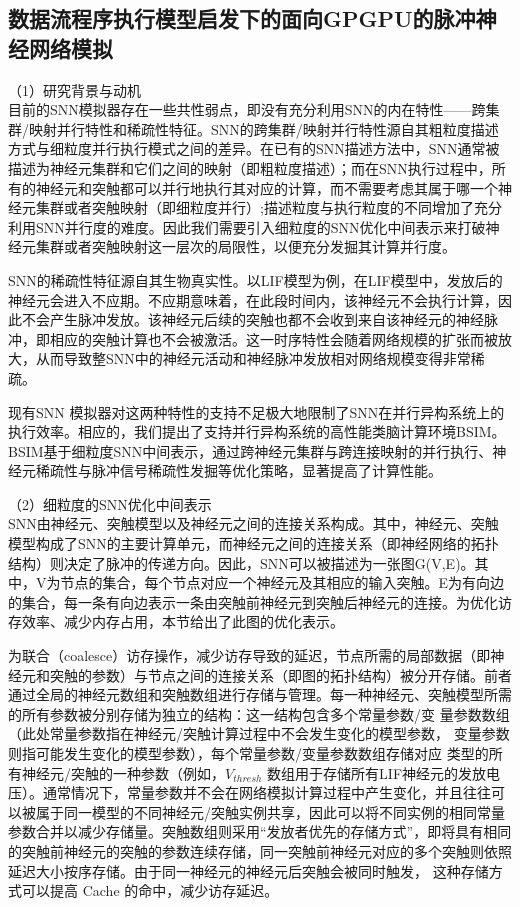 \subsection{数据流程序执行模型启发下的面向GPGPU的脉冲神经网络模拟}

（1）研究背景与动机\\

目前的SNN模拟器存在一些共性弱点，即没有充分利用SNN的内在特性——跨集群/映射并行特性和稀疏性特征。SNN的跨集群/映射并行特性源自其粗粒度描述方式与细粒度并行执行模式之间的差异。在已有的SNN描述方法中，SNN通常被描述为神经元集群和它们之间的映射（即粗粒度描述）；而在SNN执行过程中，所有的神经元和突触都可以并行地执行其对应的计算，而不需要考虑其属于哪一个神经元集群或者突触映射（即细粒度并行）;描述粒度与执行粒度的不同增加了充分利用SNN并行度的难度。因此我们需要引入细粒度的SNN优化中间表示来打破神经元集群或者突触映射这一层次的局限性，以便充分发掘其计算并行度。

SNN的稀疏性特征源自其生物真实性。以LIF模型为例，在LIF模型中，发放后的神经元会进入不应期。不应期意味着，在此段时间内，该神经元不会执行计算，因此不会产生脉冲发放。该神经元后续的突触也都不会收到来自该神经元的神经脉冲，即相应的突触计算也不会被激活。这一时序特性会随着网络规模的扩张而被放大，从而导致整SNN中的神经元活动和神经脉冲发放相对网络规模变得非常稀疏。

现有SNN 模拟器对这两种特性的支持不足极大地限制了SNN在并行异构系统上的执行效率。相应的，我们提出了支持并行异构系统的高性能类脑计算环境BSIM。BSIM基于细粒度SNN中间表示，通过跨神经元集群与跨连接映射的并行执行、神经元稀疏性与脉冲信号稀疏性发掘等优化策略，显著提高了计算性能。

（2）细粒度的SNN优化中间表示\\
SNN由神经元、突触模型以及神经元之间的连接关系构成。其中，神经元、突触模型构成了SNN的主要计算单元，而神经元之间的连接关系（即神经网络的拓扑结构）则决定了脉冲的传递方向。因此，SNN可以被描述为一张图G(V,E)。其中，V为节点的集合，每个节点对应一个神经元及其相应的输入突触。E为有向边的集合，每一条有向边表示一条由突触前神经元到突触后神经元的连接。为优化访存效率、减少内存占用，本节给出了此图的优化表示。

为联合（coalesce）访存操作，减少访存导致的延迟，节点所需的局部数据（即神经元和突触的参数）与节点之间的连接关系（即图的拓扑结构）被分开存储。前者通过全局的神经元数组和突触数组进行存储与管理。每一种神经元、突触模型所需的所有参数被分别存储为独立的结构：这一结构包含多个常量参数/变 量参数数组（此处常量参数指在神经元/突触计算过程中不会发生变化的模型参数， 变量参数则指可能发生变化的模型参数），每个常量参数/变量参数数组存储对应 类型的所有神经元/突触的一种参数（例如，$V_{thresh}$ 数组用于存储所有LIF神经元的发放电压）。通常情况下，常量参数并不会在网络模拟计算过程中产生变化，并且往往可以被属于同一模型的不同神经元/突触实例共享，因此可以将不同实例的相同常量参数合并以减少存储量。突触数组则采用“发放者优先的存储方式”，即将具有相同的突触前神经元的突触的参数连续存储，同一突触前神经元对应的多个突触则依照延迟大小按序存储。由于同一神经元的神经元后突触会被同时触发， 这种存储方式可以提高 Cache 的命中，减少访存延迟。

